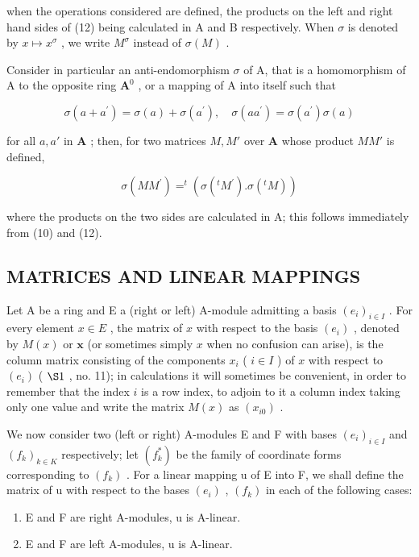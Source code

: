 when the operations considered are defined, the products on the left and right hand sides of (12) being calculated in A and B respectively. When \(\sigma\) is denoted by \(x \mapsto x^{\sigma}\) , we write \(M^{\sigma}\) instead of \(\sigma(M)\) .

Consider in particular an anti-endomorphism \(\sigma\) of A, that is a homomorphism of A to the opposite ring \(\mathbf{A}^0\) , or a mapping of A into itself such that

\[
\sigma (a + a ^ {\prime}) = \sigma (a) + \sigma (a ^ {\prime}), \quad \sigma (a a ^ {\prime}) = \sigma (a ^ {\prime}) \sigma (a)
\]

for all \(a, a'\) in \(\mathbf{A}\) ; then, for two matrices \(M, M'\) over \(\mathbf{A}\) whose product \(MM'\) is defined,

\[
\sigma (M M ^ {\prime}) = ^ {t} (\sigma (^ {t} M ^ {\prime}). \sigma (^ {t} M))\tag{13}
\]

where the products on the two sides are calculated in A; this follows immediately from (10) and (12).

\subsection{MATRICES AND LINEAR MAPPINGS}

Let A be a ring and E a (right or left) A-module admitting a basis \((e_i)_{i\in I}\) . For every element \(x\in E\) , the matrix of \(x\) with respect to the basis \((e_i)\) , denoted by \(M(x)\) or \(\mathbf{x}\) (or sometimes simply \(x\) when no confusion can arise), is the column matrix consisting of the components \(x_i\) ( \(i\in I\) ) of \(x\) with respect to \((e_i)\) ( \(\S 1\) , no. 11); in calculations it will sometimes be convenient, in order to remember that the index \(i\) is a row index, to adjoin to it a column index taking only one value and write the matrix \(M(x)\) as \((x_{i0})\) .

We now consider two (left or right) A-modules E and F with bases \((e_{i})_{i\in I}\) and \((f_{k})_{k\in K}\) respectively; let \((f_{k}^{*})\) be the family of coordinate forms corresponding to \((f_{k})\) . For a linear mapping u of E into F, we shall define the matrix of u with respect to the bases \((e_{i})\) , \((f_{k})\) in each of the following cases:

\begin{enumerate}
\def\labelenumi{(\Alph{enumi})}
\setcounter{enumi}{3}
\item
  E and F are right A-modules, u is A-linear.
\item
  E and F are left A-modules, u is A-linear.
\end{enumerate}

